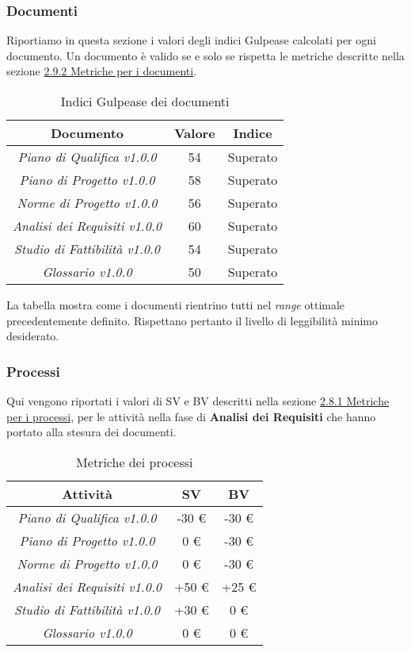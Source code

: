 \subsubsection{Documenti}
Riportiamo in questa sezione i valori degli indici Gulpease calcolati per ogni documento. Un documento è valido se e solo se rispetta le metriche descritte nella sezione \hyperref[cap:sezione 2.9.2 Metriche per i documenti]{2.9.2 Metriche per i documenti}.

\begin{table}[ht]
\centering
\begin{tabular}{|c|c|c|}
	\hline
	\textbf{Documento} & \textbf{Valore} & \textbf{Indice} \\ \hline
	\textit{Piano di Qualifica v1.0.0} & 54 & Superato \\ \hline
	\textit{Piano di Progetto v1.0.0} & 58 & Superato \\ \hline
	\textit{Norme di Progetto v1.0.0} & 56 & Superato \\ \hline
	\textit{Analisi dei Requisiti v1.0.0} & 60 & Superato \\ \hline
	\textit{Studio di Fattibilità v1.0.0} & 54 & Superato \\ \hline
	\textit{Glossario v1.0.0} & 50 & Superato \\ \hline
\end{tabular}
\caption{Indici Gulpease dei documenti}
\end{table}
La tabella mostra come i documenti rientrino tutti nel \textit{range} ottimale precedentemente definito. Rispettano pertanto il livello di leggibilità minimo desiderato.
\newpage

\subsubsection{Processi}

Qui vengono riportati i valori di SV e BV descritti nella sezione \hyperref[cap: 
sezione 2.8.1 Metriche per i processi]{2.8.1 Metriche per i processi}, 
per le attività nella fase di \textbf{Analisi dei Requisiti} che hanno portato alla stesura dei documenti.

\begin{table}[ht]
	\centering
	\begin{tabular}{|c|c|c|}
		\hline
		\textbf{Attività} & \textbf{SV} & \textbf{BV} \\ \hline
		
		\textit{Piano di Qualifica v1.0.0} & -30 € & -30 € \\ \hline
		\textit{Piano di Progetto v1.0.0} & 0 € & -30 € \\ \hline
		\textit{Norme di Progetto v1.0.0} & 0 € & -30 € \\ \hline
		\textit{Analisi dei Requisiti v1.0.0} & +50 € & +25 € \\ \hline
		\textit{Studio di Fattibilità v1.0.0} & +30 € & 0 € \\ \hline
		\textit{Glossario v1.0.0} & 0 € & 0 € \\ \hline
	\end{tabular}
	\caption{Metriche dei processi}
\end{table}

